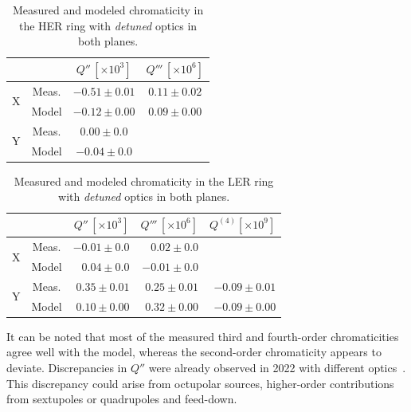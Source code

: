 \begin{table}[!htb]
    \centering
    \begin{tabular}{cccc}
        \toprule
            & & \(Q'' \, [\times 10^3]\) & \(Q''' \, [\times 10^6]\) \\ 
        \midrule
        \multirow{2}{*}{X} & Meas. & $-0.51 \pm 0.01$ & $0.11 \pm 0.02$ \\
                        & Model & $-0.12 \pm 0.00$ & $0.09 \pm 0.00$ \\
        \midrule
        \multirow{2}{*}{Y} & Meas. & $0.00 \pm 0.0$ & \\
                        & Model & $-0.04 \pm 0.0$ & \\
        \bottomrule
    \end{tabular}
    \caption{Measured and modeled chromaticity in the HER ring with \textit{detuned} optics in both
    planes.}
    \label{tab:kek:her_chroma_detuned}
\end{table}

\begin{table}[!htb]
    \centering
    \begin{tabular}{ccrrr}
        \toprule
            & & \(Q'' \, [\times 10^3]\) & \(Q''' \, [\times 10^6]\) & $Q^{(4)} [\times 10^9]$\\ 
        \midrule
        \multirow{2}{*}{X} & Meas. & $-0.01 \pm 0.0$ & $ 0.02 \pm 0.0$ \\
                        & Model & $ 0.04 \pm 0.0$ & $-0.01 \pm 0.0$ \\
        \midrule
        \multirow{2}{*}{Y} & Meas. & $0.35 \pm 0.01$ & $0.25 \pm 0.01$ & $-0.09 \pm 0.01$\\
                        & Model & $0.10 \pm 0.00$ & $0.32 \pm 0.00$ & $-0.09 \pm 0.00$ \\
        \bottomrule
    \end{tabular}
    \caption{Measured and modeled chromaticity in the LER ring with \textit{detuned} optics in both
    planes.}
    \label{tab:kek:ler_chroma_detuned}
\end{table}

It can be noted that most of the measured third and fourth-order chromaticities agree well with the
model, whereas the second-order chromaticity appears to deviate. Discrepancies in $Q''$ were already
observed in 2022 with different optics~\cite{keintzel_jacqueline_beam_2022}. This discrepancy could
arise from octupolar sources, higher-order contributions from sextupoles or quadrupoles and
feed-down.



